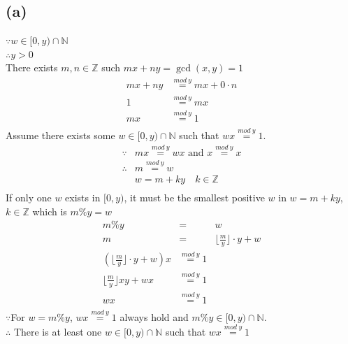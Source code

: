 \documentclass{article} %
\begin{document}
\subsection*{(a)}
$\because \mathit{w}\in [0,y) \cap \mathbb{N}$	\\
$\therefore y>0$\\
There exists $m,n\in \mathbb{Z}$ such $mx+ny =\gcd (x,y)=1$\\
\[\begin{array}{rlcr}
mx+ny&\overset{mod\ y}{=}mx+0\cdot n\\
1&\overset{mod\ y}{=}mx\\
mx&\overset{mod\ y}{=}1\\
\end{array}\]
Assume there exists some $\mathit{w}\in [0,y) \cap \mathbb{N}$ such that $\mathit{w}x\overset{mod\ y}{=}1$.
\[\begin{array}{rlcr}
\because& mx\overset{mod\ y}{=}\mathit{w}x\mbox{ and }x\overset{mod\ y}{=}x\\
\therefore& m\overset{mod\ y}{=}\mathit{w}\\
								&\mathit{w}=m+ky\quad\mbox{${k\in \mathbb{Z}}$}\\
\end{array}\]
If only one $\mathit{w}$ exists in $[0,y)$, it must be the smallest positive $\mathit{w}$ in $\mathit{w}=m+ky$, ${k\in \mathbb{Z}}$ which is $m\%y=\mathit{w}$\\
\[\begin{array}{rclr}
m\%y&=&\mathit{w}\\
m&=&\lfloor \frac{m}{y} \rfloor \cdot y+\mathit{w}\\
(\lfloor \frac{m}{y} \rfloor \cdot y+\mathit{w})x&\overset{mod\ y}{=}1\\
\lfloor \frac{m}{y} \rfloor xy+\mathit{w}x&\overset{mod\ y}{=}1\\
\mathit{w}x&\overset{mod\ y}{=}1\\
\end{array}\]
$\because$For $\mathit{w}=m\%y$, $\mathit{w}x\overset{mod\ y}{=}1$ always hold and $m\%y\in [0,y) \cap \mathbb{N}$.\\
$\therefore$ There is at least one $\mathit{w}\in [0,y) \cap \mathbb{N}$ such that $\mathit{w}x\overset{mod\ y}{=}1$\\
\end{document}
